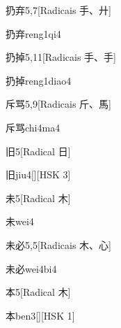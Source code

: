 \begin{entry}{扔弃}{5,7}[Radicais ⼿、⼶]
  \begin{phonetics}{扔弃}{reng1qi4}
  \end{phonetics}
\end{entry}

\begin{entry}{扔掉}{5,11}[Radicais ⼿、⼿]
  \begin{phonetics}{扔掉}{reng1diao4}
  \end{phonetics}
\end{entry}

\begin{entry}{斥骂}{5,9}[Radicais ⽄、⾺]
  \begin{phonetics}{斥骂}{chi4ma4}
  \end{phonetics}
\end{entry}

\begin{entry}{旧}{5}[Radical ⽇]
  \begin{phonetics}{旧}{jiu4}[][HSK 3]
  \end{phonetics}
\end{entry}

\begin{entry}{未}{5}[Radical ⽊]
  \begin{phonetics}{未}{wei4}
  \end{phonetics}
\end{entry}

\begin{entry}{未必}{5,5}[Radicais ⽊、⼼]
  \begin{phonetics}{未必}{wei4bi4}
  \end{phonetics}
\end{entry}

\begin{entry}{本}{5}[Radical ⽊]
  \begin{phonetics}{本}{ben3}[][HSK 1]
  \end{phonetics}
\end{entry}

